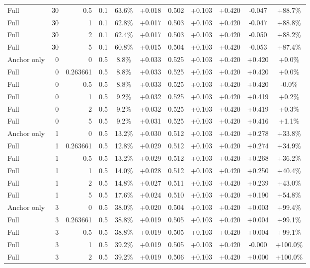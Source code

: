 \begin{table}[htbp]
\begin{tabular}{lrrrccccccc}
Full & 30 & 0.5 & 0.1 & 63.6\% & +0.018 & 0.502 & +0.103 & +0.420 & -0.047 & +88.7\% \\
Full & 30 & 1 & 0.1 & 62.8\% & +0.017 & 0.503 & +0.103 & +0.420 & -0.047 & +88.8\% \\
Full & 30 & 2 & 0.1 & 62.4\% & +0.017 & 0.503 & +0.103 & +0.420 & -0.050 & +88.2\% \\
Full & 30 & 5 & 0.1 & 60.8\% & +0.015 & 0.504 & +0.103 & +0.420 & -0.053 & +87.4\% \\
Anchor only & 0 & 0 & 0.5 & 8.8\% & +0.033 & 0.525 & +0.103 & +0.420 & +0.420 & +0.0\% \\
Full & 0 & 0.263661 & 0.5 & 8.8\% & +0.033 & 0.525 & +0.103 & +0.420 & +0.420 & +0.0\% \\
Full & 0 & 0.5 & 0.5 & 8.8\% & +0.033 & 0.525 & +0.103 & +0.420 & +0.420 & -0.0\% \\
Full & 0 & 1 & 0.5 & 9.2\% & +0.032 & 0.525 & +0.103 & +0.420 & +0.419 & +0.2\% \\
Full & 0 & 2 & 0.5 & 9.2\% & +0.032 & 0.525 & +0.103 & +0.420 & +0.419 & +0.3\% \\
Full & 0 & 5 & 0.5 & 9.2\% & +0.031 & 0.525 & +0.103 & +0.420 & +0.416 & +1.1\% \\
Anchor only & 1 & 0 & 0.5 & 13.2\% & +0.030 & 0.512 & +0.103 & +0.420 & +0.278 & +33.8\% \\
Full & 1 & 0.263661 & 0.5 & 12.8\% & +0.029 & 0.512 & +0.103 & +0.420 & +0.274 & +34.9\% \\
Full & 1 & 0.5 & 0.5 & 13.2\% & +0.029 & 0.512 & +0.103 & +0.420 & +0.268 & +36.2\% \\
Full & 1 & 1 & 0.5 & 14.0\% & +0.028 & 0.512 & +0.103 & +0.420 & +0.250 & +40.4\% \\
Full & 1 & 2 & 0.5 & 14.8\% & +0.027 & 0.511 & +0.103 & +0.420 & +0.239 & +43.0\% \\
Full & 1 & 5 & 0.5 & 17.6\% & +0.024 & 0.510 & +0.103 & +0.420 & +0.190 & +54.8\% \\
Anchor only & 3 & 0 & 0.5 & 38.0\% & +0.020 & 0.504 & +0.103 & +0.420 & +0.003 & +99.4\% \\
Full & 3 & 0.263661 & 0.5 & 38.8\% & +0.019 & 0.505 & +0.103 & +0.420 & +0.004 & +99.1\% \\
Full & 3 & 0.5 & 0.5 & 38.8\% & +0.019 & 0.505 & +0.103 & +0.420 & +0.004 & +99.1\% \\
Full & 3 & 1 & 0.5 & 39.2\% & +0.019 & 0.505 & +0.103 & +0.420 & -0.000 & +100.0\% \\
Full & 3 & 2 & 0.5 & 39.2\% & +0.019 & 0.506 & +0.103 & +0.420 & +0.000 & +100.0\% \\

\end{tabular}
\end{table}
